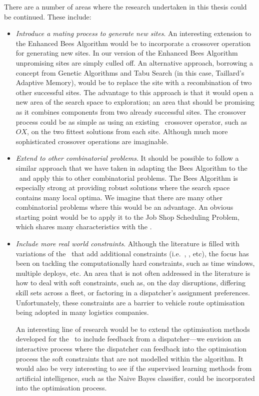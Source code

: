 There are a number of areas where the research undertaken in this thesis could be continued. These include:

\begin{itemize}

   \item \emph{Introduce a mating process to generate new sites}. An interesting extension to the Enhanced Bees Algorithm would be to incorporate a crossover operation for generating new sites. In our version of the Enhanced Bees Algorithm unpromising sites are simply culled off. An alternative approach, borrowing a concept from Genetic Algorithms and Tabu Search (in this case, Taillard's Adaptive Memory), would be to replace the site with a recombination of two other successful sites. The advantage to this approach is that it would open a new area of the search space to exploration; an area that should be promising as it combines components from two already successful sites. The crossover process could be as simple as using an existing \VRP\ crossover operator, such as $OX$, on the two fittest solutions from each site. Although much more sophisticated crossover operations are imaginable.

   \item \emph{Extend to other combinatorial problems}. It should be possible to follow a similar approach that we have taken in adapting the Bees Algorithm to the \VRP\ and apply this to other combinatorial problems. The Bees Algorithm is especially strong at providing robust solutions where the search space contains many local optima. We imagine that there are many other combinatorial problems where this would be an advantage. An obvious starting point would be to apply it to the Job Shop Scheduling Problem, which shares many characteristics with the \VRP.

   \item \emph{Include more real world constraints}. Although the literature is filled with variations of the \VRP\ that add additional constraints (i.e.~\VRPTW, \PDP, etc), the focus has been on tackling the computationally hard constraints, such as time windows, multiple deploys, etc. An area that is not often addressed in the literature is how to deal with soft constraints, such as, on the day disruptions, differing skill sets across a fleet, or factoring in a dispatcher's assignment preferences. Unfortunately, these constraints are a barrier to vehicle route optimisation being adopted in many logistics companies. 
   
   An interesting line of research would be to extend the optimisation methods developed for the \VRP\ to include feedback from a dispatcher---we envision an interactive process where the dispatcher can feedback into the optimisation process the soft constraints that are not modelled within the algorithm. It would also be very interesting to see if the supervised learning methods from artificial intelligence, such as the Naive Bayes classifier, could be incorporated into the optimisation process.
      
\end{itemize}

